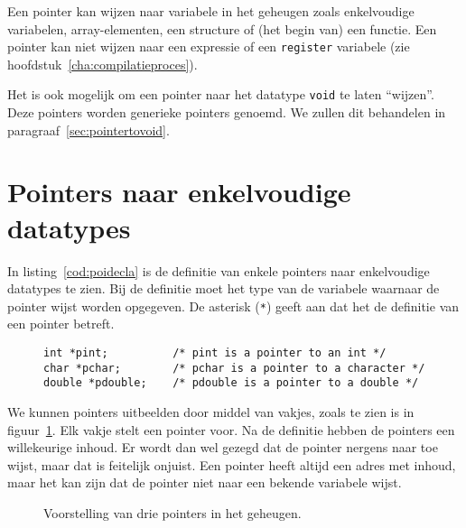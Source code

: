 
Een pointer kan wijzen naar variabele in het geheugen zoals enkelvoudige variabelen, array-elementen, een structure of (het begin van) een functie. Een pointer kan niet wijzen naar een expressie of een \texttt{register} variabele (zie hoofdstuk~\ref{cha:compilatieproces}).

Het is ook mogelijk om een pointer naar het datatype \texttt{void} te laten ``wijzen''. Deze pointers worden generieke pointers genoemd. We zullen dit behandelen in paragraaf~\ref{sec:pointertovoid}.

\section{Pointers naar enkelvoudige datatypes}
\label{sec:pointersnaarenkelvoudigedatatypes}
In listing~\ref{cod:poidecla} is de definitie van enkele pointers naar enkelvoudige datatypes te zien. Bij de definitie moet het type van de variabele waarnaar de pointer wijst worden opgegeven. De asterisk (\texttt{*}) geeft aan dat het de definitie van een pointer betreft.

\begin{figure}[!ht]
\begin{lstlisting}[caption=Enkele definities van pointers.,label=cod:poidecla]
int *pint;          /* pint is a pointer to an int */
char *pchar;        /* pchar is a pointer to a character */
double *pdouble;    /* pdouble is a pointer to a double */
\end{lstlisting}
\end{figure}

We kunnen pointers uitbeelden door middel van vakjes, zoals te zien is in figuur~\ref{fig:poivoorstelling1}. Elk vakje stelt een pointer voor. Na de definitie hebben de pointers een willekeurige inhoud. Er wordt dan wel gezegd dat de pointer nergens naar toe wijst, maar dat is feitelijk onjuist. Een pointer heeft altijd een adres met inhoud, maar het kan zijn dat de pointer niet naar een bekende variabele wijst.

\begin{figure}[!ht]
\centering
{}
\caption{Voorstelling van drie pointers in het geheugen.}
\label{fig:poivoorstelling1}
\end{figure}

